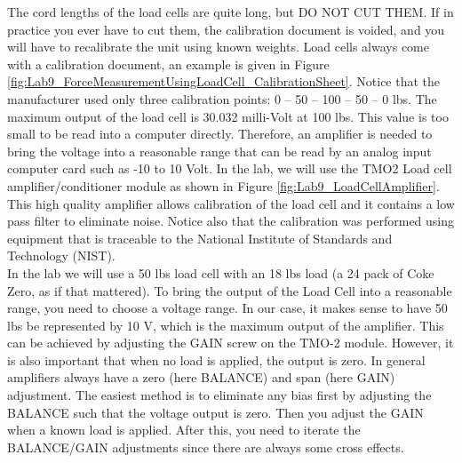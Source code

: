 \documentclass[12pt,letterpaper]{article}
\begin{document}
The cord lengths of the load cells are quite long, but DO NOT CUT THEM. If in practice you ever have to cut them, the calibration document is voided, and you will have to recalibrate the unit using known weights. Load cells always come with a calibration document, an example is given in Figure \ref{fig:Lab9_ForceMeasurementUsingLoadCell_CalibrationSheet}. Notice that the manufacturer used only three calibration points: 0 – 50 – 100 – 50 – 0 lbs.  The maximum output of the load cell is 30.032 milli-Volt at 100 lbs. This value is too small to be read into a computer directly. Therefore, an amplifier is needed to bring the voltage into a reasonable range that can be read by an analog input computer card such as -10 to 10 Volt. In the lab, we will use the TMO2 Load cell amplifier/conditioner module as shown in Figure \ref{fig:Lab9_LoadCellAmplifier}. This high quality amplifier allows calibration of the load cell and it contains a low pass filter to eliminate noise. Notice also that the calibration was performed using equipment that is traceable to the National Institute of Standards and Technology (NIST).\\

In the lab we will use a 50 lbs load cell with an 18 lbs load (a 24 pack of Coke Zero, as if that mattered). To bring the output of the Load Cell into a reasonable range, you need to choose a voltage range. In our case, it makes sense to have 50 lbs be represented by 10 V, which is the maximum output of the amplifier. This can be achieved by adjusting the GAIN screw on the TMO-2 module. However, it is also important that when no load is applied, the output is zero. In general amplifiers always have a zero (here BALANCE) and span (here GAIN) adjustment. The easiest method is to eliminate any bias first by adjusting the BALANCE such that the voltage output is zero. Then you adjust the GAIN when a known load is applied. After this, you need to iterate the BALANCE/GAIN adjustments since there are always some cross effects.\\ 
\end{document}

